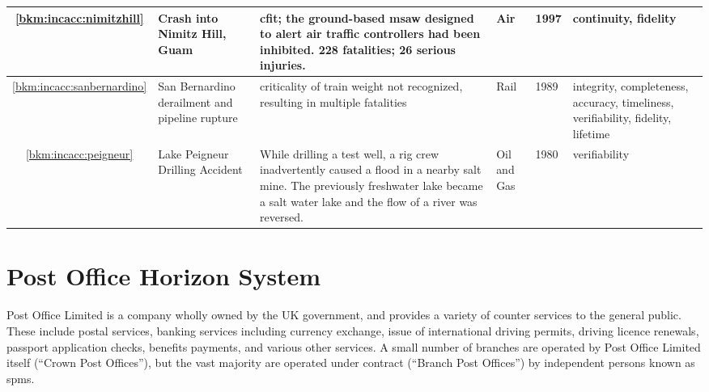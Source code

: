 \begin{longtable}{|C{}|L{}|L{}|L{}|L{}|L{}|}
	\hline
	\ref{bkm:incacc:nimitzhill} & Crash into Nimitz Hill, Guam & \Gls{cfit}; the ground-based \gls{msaw} designed to alert air traffic controllers had been inhibited. 228 fatalities; 26 serious injuries. & Air & 1997 & \Gls{continuity}, \gls{fidelity}\\
	\hline
        \ref{bkm:incacc:sanbernardino} &
        San Bernardino  derailment and pipeline rupture & \Gls{criticality} of train weight not recognized,
        resulting in multiple fatalities &
        Rail & 1989 & \Gls{integrity}, \gls{completeness}, \gls{accuracy}, \gls{timeliness}, \gls{verifiability}, \gls{fidelity}, \gls{lifetime} \\
        \hline
	\ref{bkm:incacc:peigneur} & Lake Peigneur Drilling Accident & While drilling a test well, a rig crew inadvertently caused a flood in a nearby salt mine. The previously freshwater lake became a salt water lake and the flow of a river was reversed. & Oil and Gas & 1980 & \Gls{verifiability} \\
	\hline

\end{longtable}

\section{Post Office Horizon System}\label{bkm:incacc:horizon}
Post Office Limited is a company wholly owned by the UK government, and provides a variety of counter services to the general public. These include postal services, banking services including currency exchange, issue of international driving permits, driving licence renewals, passport application checks, benefits payments, and various other services. A small number of branches are operated by Post Office Limited itself (``Crown Post Offices''), but the vast majority are operated under contract (``Branch Post Offices'') by independent persons known as \glspl{spm}.

